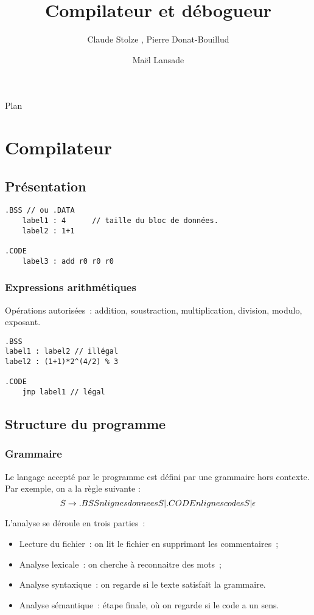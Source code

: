 \documentclass{beamer}
\title[Compilateur et débogueur] %
{Compilateur et débogueur}
\author[Claude Stolze, Pierre Donat-Bouillud, Maël Lansade]{Claude Stolze , Pierre Donat-Bouillud \and Maël Lansade}
\institute[ENS Cachan - Antenne de Bretagne]
\begin{document}
\begin{frame}
  \titlepage
\end{frame}

\begin{frame}{Plan}
  \tableofcontents
\end{frame}

\section{Compilateur}
\subsection{Présentation}
\begin{frame}[fragile]
\begin{verbatim}
.BSS // ou .DATA
	label1 : 4		// taille du bloc de données.
	label2 : 1+1

.CODE
	label3 : add r0 r0 r0
\end{verbatim}
\end{frame}

\begin{frame}[fragile]
\frametitle{Expressions arithmétiques}
Opérations autorisées~: addition, soustraction, multiplication, division, modulo, exposant.
\begin{verbatim}
.BSS
label1 : label2 // illégal
label2 : (1+1)*2^(4/2) % 3

.CODE
	jmp label1 // légal
\end{verbatim}
\end{frame}

\subsection{Structure du programme}
\begin{frame}
\frametitle{Grammaire}
Le langage accepté par le programme est défini par une grammaire hors contexte.
Par exemple, on a la règle suivante :
\[ S \rightarrow .BSS \\n lignesdonnees S | .CODE \\n lignescodes S | \epsilon \]
\end{frame}

\begin{frame}
L'analyse se déroule en trois parties~:
\begin{itemize}
\item Lecture du fichier~: on lit le fichier en supprimant les commentaires~;
\item Analyse lexicale~: on cherche à reconnaitre des mots~;
\item Analyse syntaxique~: on regarde si le texte satisfait la grammaire.
\item Analyse sémantique~: étape finale, où on regarde si le code a un sens.
\end{itemize}
\end{frame}
\end{document}
